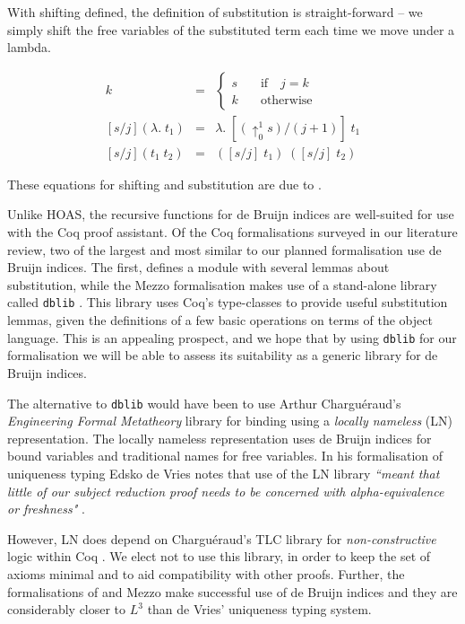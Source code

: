 \documentclass[]{unswthesis}
\newcommand{\SSPHS}{\text{SSPHS }}
\let\c\texttt
\let\i\textit
\begin{document}
With shifting defined, the definition of substitution is straight-forward -- we simply shift the free variables of the substituted term each time we move under a lambda.

\begin{eqnarray*}
[s/j]k & = &
	\begin{cases}
	s \quad & \text{if} \quad j = k \\
	k \quad & \text{otherwise}
	\end{cases}\\
\left[s/j\right](\lambda. \; t_1) & = & \lambda. \; [(\uparrow^1_0 s)/(j + 1)] \; t_1\\
\left[s/j\right](t_1 \; t_2) & = & ([s/j] \; t_1) \; ([s/j] \; t_2)
\end{eqnarray*}

These equations for shifting and substitution are due to \cite{tapl}.

Unlike HOAS, the recursive functions for de Bruijn indices are well-suited for use with the Coq proof assistant. Of the Coq formalisations surveyed in our literature review, two of the largest and most similar to our planned formalisation use de Bruijn indices. The first, \SSPHS \cite{pottier13} defines a module with several lemmas about substitution, while the Mezzo formalisation \cite{mezzo14} makes use of a stand-alone library called \c{dblib} \cite{dblib13}. This library uses Coq's type-classes to provide useful substitution lemmas, given the definitions of a few basic operations on terms of the object language. This is an appealing prospect, and we hope that by using \c{dblib} for our formalisation we will be able to assess its suitability as a generic library for de Bruijn indices.

The alternative to \c{dblib} would have been to use Arthur Chargu\'{e}raud's \i{Engineering Formal Metatheory} library \cite{aydemir08} for binding using a \i{locally nameless} (LN) representation. The locally nameless representation uses de Bruijn indices for bound variables and traditional names for free variables. In his formalisation of uniqueness typing Edsko de Vries notes that use of the LN library \i{``meant that little of our subject reduction proof needs to be concerned with alpha-equivalence or freshness"} \cite{deVries07}.

However, LN does depend on Chargu\'{e}raud's TLC library for \i{non-constructive} logic within Coq \cite{tlc15}. We elect not to use this library, in order to keep the set of axioms minimal and to aid compatibility with other proofs. Further, the formalisations of \SSPHS and Mezzo make successful use of de Bruijn indices and they are considerably closer to $L^3$ than de Vries' uniqueness typing system.
\end{document}

